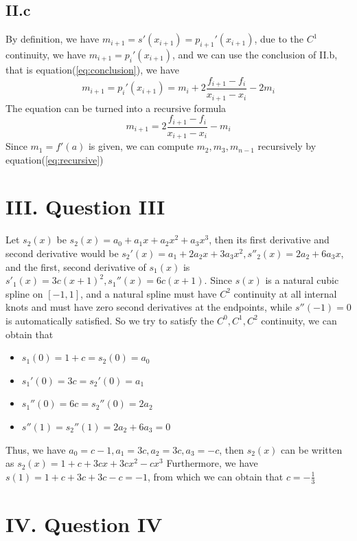 \documentclass[a4paper]{article}
\begin{document}
\subsection*{II.c}

By definition, we have $m_{i+1}=s'(x_{i+1})=p_{i+1}'(x_{i+1})$, due to the $C^1$ continuity, we have $m_{i+1}=p_i'(x_{i+1})$, and we can use the conclusion of II.b, that is equation(\ref{eq:conclusion}), we have
\begin{equation}
  m_{i+1}=p_{i}'(x_{i+1})=m_i+2\frac{f_{i+1}-f_i}{x_{i+1}-x_i}-2m_i
\end{equation}
The equation can be turned into a recursive formula
\begin{equation}
  m_{i+1}=2\frac{f_{i+1}-f_i}{x_{i+1}-x_i}-m_i \label{eq:recursive}
\end{equation}
Since $m_1=f'(a)$ is given, we can compute $m_2,m_3,m_{n-1}$ recursively by equation(\ref{eq:recursive})

\section*{III. Question III}

Let $s_2(x)$ be $s_2(x)=a_0+a_1x+a_2x^2+a_3x^3$, then its first derivative and second derivative would be $s_2'(x)=a_1+2a_2x+3a_3x^2,s''_2(x)=2a_2+6a_3x$, and the first, second derivative of $s_1(x)$ is $s'_1(x)=3c(x+1)^2,s_1''(x)=6c(x+1)$.
Since $s(x)$ is a natural cubic spline on $[-1,1]$, and a natural spline must have $C^2$ continuity at all internal knots and must have zero second derivatives at the endpoints, while $s''(-1)=0$ is automatically satisfied. So we try to satisfy the $C^0,C^1,C^2$ continuity, we can obtain that
\begin{itemize}
  \item $s_1(0)=1+c=s_2(0)=a_0$
  \item $s_1'(0)=3c=s_2'(0)=a_1$
  \item $s_1''(0)=6c=s_2''(0)=2a_2$ 
  \item $s''(1)=s_2''(1)=2a_2+6a_3=0$
\end{itemize}
Thus, we have $a_0=c-1,a_1=3c,a_2=3c,a_3=-c$, then $s_2(x)$ can be written as $s_2(x)=1+c+3cx+3cx^2-cx^3$
Furthermore, we have $s(1)=1+c+3c+3c-c=-1$, from which we can obtain that $c=-\frac{1}{3}$
\section*{IV. Question IV}
\end{document}
